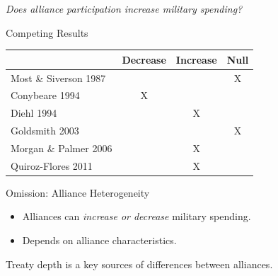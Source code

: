 \documentclass[12pt]{beamer}
\begin{document}

\begin{frame}[standout]

\huge \textit{Does alliance participation increase military spending?} 

 \end{frame}


\begin{frame}{Competing Results}

\begin{table}[hbt!]
\begin{center}
\begin{tabular}{lccc}
     & Decrease & Increase & Null \\
\hline
Most \& Siverson 1987  &  &  & X \\
Conybeare 1994 & X & &  \\
Diehl 1994 &  & X &  \\
Goldsmith 2003 &  &  & X \\
Morgan \& Palmer 2006 &  & X & \\ 
Quiroz-Flores 2011 &  & X &  \\ 
\hline
\end{tabular}
\end{center} 
\end{table}


 \end{frame}


\begin{frame}{Omission: Alliance Heterogeneity}


\begin{itemize}
\item Alliances can \textit{increase or decrease} military spending. 
\pause
\item Depends on alliance characteristics. 
\end{itemize} 

\end{frame}

 \begin{frame}[standout]

Treaty depth is a key sources of differences between alliances. 

 \end{frame}
\end{document}
